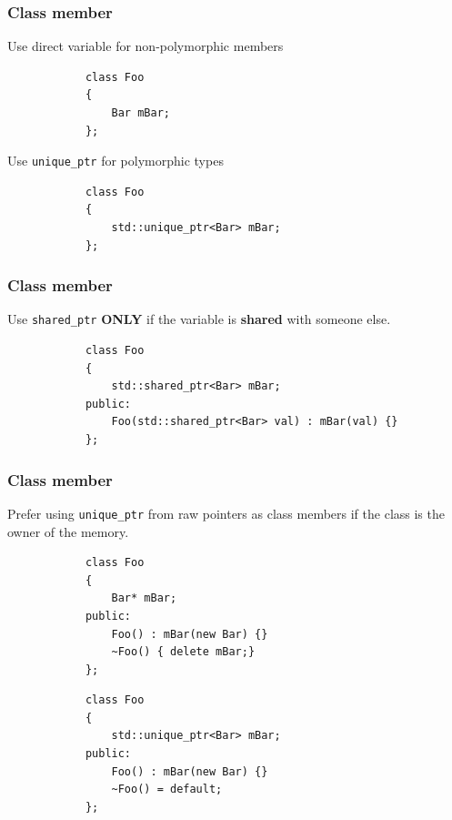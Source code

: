 \documentclass{beamer}
\begin{document}
\begin{frame}[fragile]
\frametitle{Class member}
	Use direct variable for non-polymorphic members
	\begin{example}
		\begin{lstlisting}
			class Foo
			{
				Bar mBar;
			};
		\end{lstlisting}
	\end{example}
	Use \texttt{unique\_ptr} for polymorphic types
	\begin{example}
		\begin{lstlisting}
			class Foo
			{
				std::unique_ptr<Bar> mBar;
			};
		\end{lstlisting}
	\end{example}
\end{frame}

\begin{frame}[fragile]
\frametitle{Class member}
	Use \texttt{shared\_ptr} \textbf{ONLY} if the variable is \textbf{shared} with someone
	else.
	\begin{example}
		\begin{lstlisting}
			class Foo
			{
				std::shared_ptr<Bar> mBar;
			public:
				Foo(std::shared_ptr<Bar> val) : mBar(val) {}
			};
		\end{lstlisting}
	\end{example}
\end{frame}

\begin{frame}[fragile]
\frametitle{Class member}
	Prefer using \texttt{unique\_ptr} from raw pointers as class members if the class is the owner of the memory.
	\begin{example}
		\begin{lstlisting}
			class Foo
			{
				Bar* mBar;
			public:
				Foo() : mBar(new Bar) {}
				~Foo() { delete mBar;}
			};
		\end{lstlisting}
	\end{example}
    \begin{example}
		\begin{lstlisting}
			class Foo
			{
				std::unique_ptr<Bar> mBar;
			public:
				Foo() : mBar(new Bar) {}
				~Foo() = default;
			};
		\end{lstlisting}
	\end{example}
\end{frame}
\end{document}
